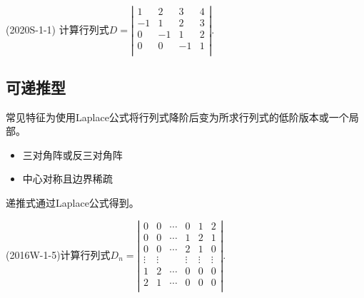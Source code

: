 \documentclass[lang=cn,newtx,10pt,scheme=chinese]{elegantbook}
\begin{document}
\begin{exercise}
  (2020S-1-1)  计算行列式$D = 
  \left|
	\begin{array}{cccc}
		1   & 2   & 3   & 4 \\
		-1  & 1   & 2   & 3 \\
		0   & -1  & 1   & 2 \\
		0   & 0   & -1  & 1 \\
	\end{array}
  \right|
  .
  $
\end{exercise}

\subsection{可递推型}
常见特征为使用Laplace公式将行列式降阶后变为所求行列式的低阶版本或一个局部。
\begin{itemize}
	\item 三对角阵或反三对角阵
	\item 中心对称且边界稀疏
\end{itemize}
递推式通过Laplace公式得到。

\begin{example}
	(2016W-1-5)计算行列式$
	D_n = 
	\left|
	\begin{array}{cccccc}
		0       & 0       & \cdots & 0      & 1       & 2       \\
		0       & 0       & \cdots & 1      & 2       & 1       \\
		0       & 0       & \cdots & 2      & 1       & 0       \\
		\vdots  & \vdots  &        & \vdots & \vdots  & \vdots  \\
		1       & 2       & \cdots & 0      & 0       & 0       \\
		2       & 1       & \cdots & 0      & 0       & 0       \\
	\end{array}
	\right|
	.
	$
\end{example}
\end{document}
